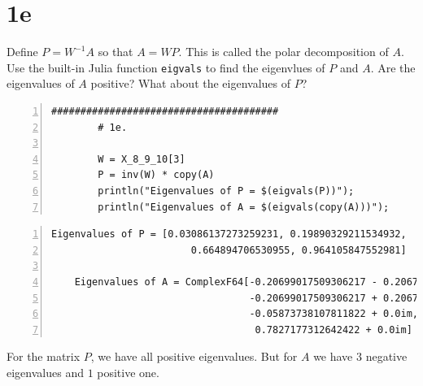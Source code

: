 \documentclass{article}
\begin{document}
    \section*{1e}
    Define $P = W^{-1}A$ so that $A = WP$. This is called the polar decomposition of $A$. Use the built-in Julia function \texttt{eigvals} to find the eigenvlues of $P$ and $A$. Are the eigenvalues of $A$ positive? What about the eigenvalues of $P$?
    \vspace{1em}
    \begin{Verbatim}[frame=single, label=Find and display eigenvalues of P and A, numbers=left, fontsize=\small, xleftmargin=0cm, framesep=3mm]
        #######################################
        # 1e.
  
        W = X_8_9_10[3]
        P = inv(W) * copy(A)
        println("Eigenvalues of P = $(eigvals(P))");
        println("Eigenvalues of A = $(eigvals(copy(A)))");
    \end{Verbatim}
    \vspace{1em}
    \begin{Verbatim}[frame=single, label=Julia REPL for eigenvalues of P and A, numbers=left, fontsize=\small, xleftmargin=-.0cm, xrightmargin=-.0cm, framesep=3mm]
    Eigenvalues of P = [0.03086137273259231, 0.19890329211534932,
                        0.664894706530955, 0.964105847552981]

    Eigenvalues of A = ComplexF64[-0.20699017509306217 - 0.2067450022872031im,
                                  -0.20699017509306217 + 0.2067450022872031im,
                                  -0.05873738107811822 + 0.0im,
                                   0.7827177312642422 + 0.0im]
    \end{Verbatim}
    For the matrix $P$, we have all positive eigenvalues. But for $A$ we have $3$ negative eigenvalues and $1$ positive one. 
\end{document}
